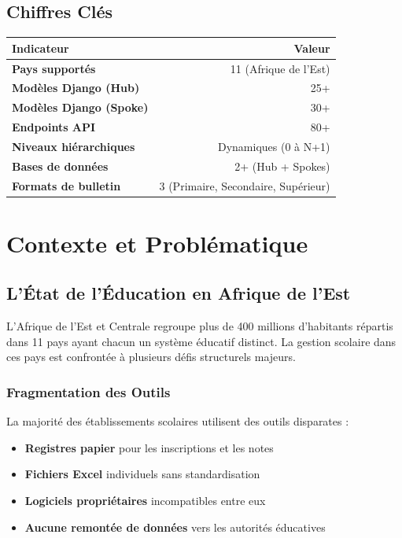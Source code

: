 \documentclass[12pt,a4paper,oneside]{report}
\begin{document}
\section{Chiffres Clés}

\begin{center}
\begin{tabular}{>{\bfseries}l r}
\toprule
Indicateur & Valeur \\
\midrule
Pays supportés & 11 (Afrique de l'Est) \\
Modèles Django (Hub) & 25+ \\
Modèles Django (Spoke) & 30+ \\
Endpoints API & 80+ \\
Niveaux hiérarchiques & Dynamiques (0 à N+1) \\
Bases de données & 2+ (Hub + Spokes) \\
Formats de bulletin & 3 (Primaire, Secondaire, Supérieur) \\
\bottomrule
\end{tabular}
\end{center}


\chapter{Contexte et Problématique}

\section{L'État de l'Éducation en Afrique de l'Est}

L'Afrique de l'Est et Centrale regroupe plus de 400 millions d'habitants répartis dans 11 pays ayant chacun un système éducatif distinct. La gestion scolaire dans ces pays est confrontée à plusieurs défis structurels majeurs.

\subsection{Fragmentation des Outils}

La majorité des établissements scolaires utilisent des outils disparates :

\begin{itemize}
  \item \textbf{Registres papier} pour les inscriptions et les notes
  \item \textbf{Fichiers Excel} individuels sans standardisation
  \item \textbf{Logiciels propriétaires} incompatibles entre eux
  \item \textbf{Aucune remontée de données} vers les autorités éducatives
\end{itemize}
\end{document}
